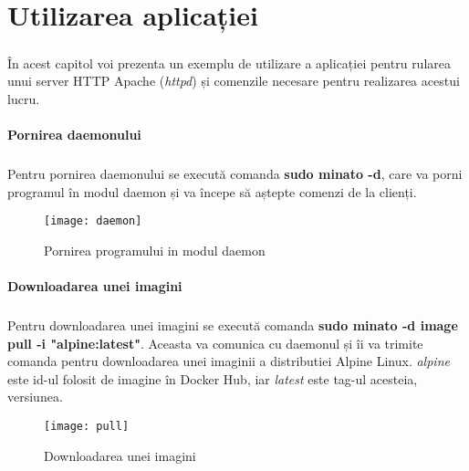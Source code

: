 \chapter{Utilizarea aplicației}
    \paragraph{} În acest capitol voi prezenta un exemplu de utilizare a aplicației pentru rularea unui server HTTP Apache (\textit{httpd}) și comenzile necesare pentru realizarea acestui lucru.

    \subsubsection{Pornirea daemonului}
        \paragraph{} Pentru pornirea daemonului se execută comanda \textbf{sudo minato -d}, care va porni programul în modul daemon și va începe să aștepte comenzi de la clienți.
        \begin{figure}[h!]
            \centering
            \texttt{[image: daemon]}
            \caption{Pornirea programului in modul daemon}
            \label{fig:daemon}
        \end{figure}

    \subsubsection{Downloadarea unei imagini}
        \paragraph{} Pentru downloadarea unei imagini se execută comanda \textbf{sudo minato -d image pull -i "alpine:latest"}. Aceasta va comunica cu daemonul și îi va trimite comanda pentru downloadarea unei imaginii a distributiei Alpine Linux. \textit{alpine} este id-ul folosit de imagine în Docker Hub, iar \textit{latest} este tag-ul acesteia, versiunea.
        \begin{figure}[h!]
            \centering
            \texttt{[image: pull]}
            \caption{Downloadarea unei imagini}
            \label{fig:pull}
        \end{figure}

